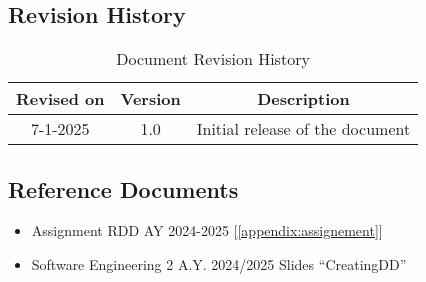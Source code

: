 \subsection{Revision History}
\begin{table}[h]
    \centering
    \begin{tabular}{|c|c|c|}
        \hline
        \textbf{Revised on} & \textbf{Version} & \textbf{Description}\\ \hline
        7-1-2025 & 1.0     & Initial release of the document \\ \hline
    \end{tabular}
    \caption{Document Revision History}
    \label{tab:revision_history_table}
\end{table}

\subsection{Reference Documents}
\begin{itemize}
  \item Assignment RDD AY 2024-2025 [\ref{appendix:assignement}]
  \item Software Engineering 2 A.Y. 2024/2025 Slides “CreatingDD” 
\end{itemize}

